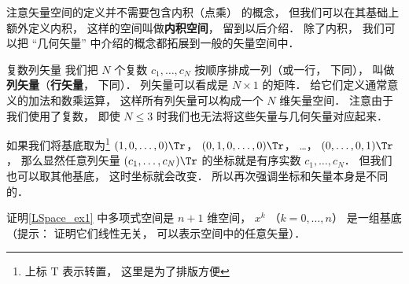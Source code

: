注意矢量空间的定义并不需要包含内积（点乘） 的概念， 但我们可以在其基础上额外定义内积， 这样的空间叫做\textbf{内积空间}， 留到以后介绍． 除了内积， 我们可以把 “几何矢量” 中介绍的概念都拓展到一般的矢量空间中．

\begin{exercise}{复数列矢量}
我们把 $N$ 个复数 $c_1, \dots, c_N$ 按顺序排成一列（或一行， 下同）， 叫做\textbf{列矢量}（\textbf{行矢量}， 下同）． 列矢量可以看成是 $N \times 1$ 的矩阵． 给它们定义通常意义的加法和数乘运算， 这样所有列矢量可以构成一个 $N$ 维矢量空间． 注意由于我们使用了复数， 即使 $N \leqslant 3$ 时我们也无法将这些矢量与几何矢量对应起来．

如果我们将基底取为\footnote{上标 $\mathrm T$ 表示转置， 这里是为了排版方便} $(1, 0, \dots, 0)\Tr$， $(0, 1, 0, \dots, 0)\Tr$， …， $(0, \dots, 0, 1)\Tr$， 那么显然任意列矢量 $(c_1, \dots, c_N)\Tr$ 的坐标就是有序实数 $c_1, \dots, c_N$． 但我们也可以取其他基底， 这时坐标就会改变． 所以再次强调坐标和矢量本身是不同的．
\end{exercise}

\begin{exercise}{}
证明\autoref{LSpace_ex1} 中多项式空间是 $n+1$ 维空间， $x^k$ （$k = 0, \dots, n$） 是一组基底（提示： 证明它们线性无关， 可以表示空间中的任意矢量）．
\end{exercise}
